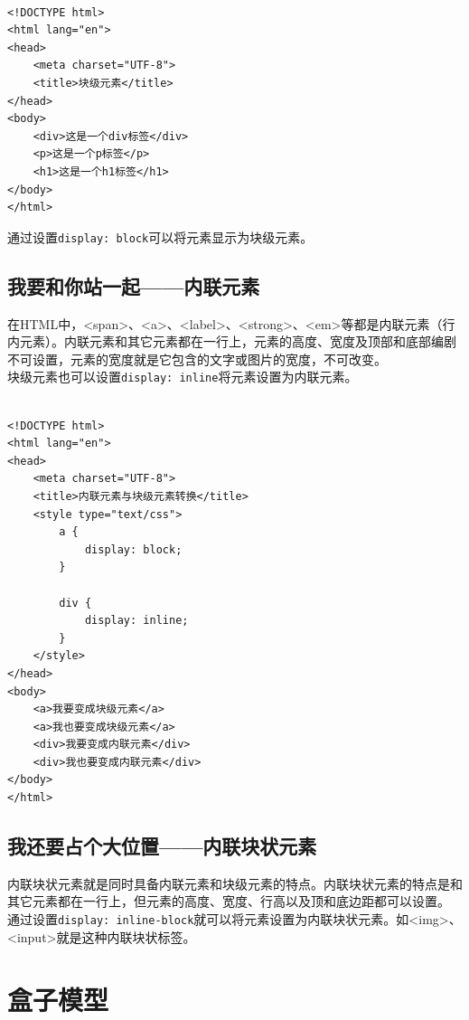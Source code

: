  \\
\begin{lstlisting}[style=htmlcssjs]
<!DOCTYPE html>
<html lang="en">
<head>
    <meta charset="UTF-8">
    <title>块级元素</title>
</head>
<body>
    <div>这是一个div标签</div>
    <p>这是一个p标签</p>
    <h1>这是一个h1标签</h1>
</body>
</html>
\end{lstlisting}

通过设置\lstinline|display: block|可以将元素显示为块级元素。

\subsection{我要和你站一起——内联元素}

在HTML中，<span>、<a>、<label>、<strong>、<em>等都是内联元素（行内元素）。内联元素和其它元素都在一行上，元素的高度、宽度及顶部和底部编剧不可设置，元素的宽度就是它包含的文字或图片的宽度，不可改变。 \\

块级元素也可以设置\lstinline|display: inline|将元素设置为内联元素。 \\

 \\
\begin{lstlisting}[style=htmlcssjs]
<!DOCTYPE html>
<html lang="en">
<head>
    <meta charset="UTF-8">
    <title>内联元素与块级元素转换</title>
    <style type="text/css">
        a {
            display: block;
        }

        div {
            display: inline;
        }
    </style>
</head>
<body>
    <a>我要变成块级元素</a>
    <a>我也要变成块级元素</a>
    <div>我要变成内联元素</div>
    <div>我也要变成内联元素</div>
</body>
</html>
\end{lstlisting}

\subsection{我还要占个大位置——内联块状元素}

内联块状元素就是同时具备内联元素和块级元素的特点。内联块状元素的特点是和其它元素都在一行上，但元素的高度、宽度、行高以及顶和底边距都可以设置。 \\

通过设置\lstinline|display: inline-block|就可以将元素设置为内联块状元素。如<img>、<input>就是这种内联块状标签。

\newpage

\section{盒子模型}

